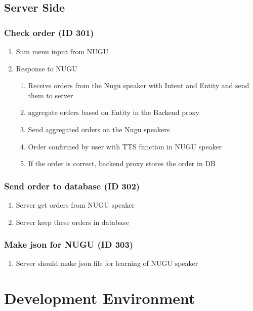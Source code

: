 \documentclass[conference,compsoc]{IEEEtran}
\begin{document}
\subsection{Server Side}

\subsubsection{Check order (ID 301)}
\begin{enumerate}
  \item Sum menu input from NUGU
  \item Response to NUGU
  \begin{enumerate}
    \item Receive orders from the Nugu speaker with Intent and Entity and send them to server
    \item aggregate orders based on Entity in the Backend proxy
    \item Send aggregated orders on the Nugu speakers
    \item Order confirmed by user with TTS function in NUGU speaker
    \item If the order is correct, backend proxy stores the order in DB
  \end{enumerate}
\end{enumerate}

\subsubsection{Send order to database (ID 302)}
\begin{enumerate}
  \item Server get orders from NUGU speaker
  \item Server keep these orders in database  
\end{enumerate}


\subsubsection{Make json for NUGU (ID 303)}
\begin{enumerate}
  \item Server should make json file for learning of NUGU speaker  
\end{enumerate}


\section{Development Environment}
\end{document}
